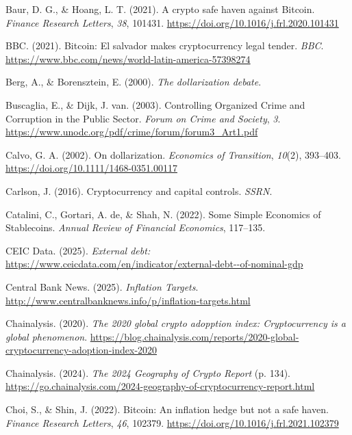 \documentclass[
]{article}
\newlength{\cslhangindent}
\newenvironment{CSLReferences}[2] %
 {\begin{list}{}{%
  \setlength{\itemindent}{0pt}
  \setlength{\leftmargin}{0pt}
  \setlength{\parsep}{0pt}
  \ifodd #1
   \setlength{\leftmargin}{\cslhangindent}
   \setlength{\itemindent}{-1\cslhangindent}
  \fi
  \setlength{\itemsep}{#2\baselineskip}}}
 {\end{list}}
\begin{document}
\begin{CSLReferences}{1}{0}
Baur, D. G., \& Hoang, L. T. (2021). A crypto safe haven against Bitcoin. \emph{Finance Research Letters}, \emph{38}, 101431. \url{https://doi.org/10.1016/j.frl.2020.101431}

BBC. (2021). Bitcoin: El salvador makes cryptocurrency legal tender. \emph{BBC}. \url{https://www.bbc.com/news/world-latin-america-57398274}

Berg, A., \& Borensztein, E. (2000). \emph{The dollarization debate}.

Buscaglia, E., \& Dijk, J. van. (2003). Controlling Organized Crime and Corruption in the Public Sector. \emph{Forum on Crime and Society}, \emph{3}. \url{https://www.unodc.org/pdf/crime/forum/forum3_Art1.pdf}

Calvo, G. A. (2002). On dollarization. \emph{Economics of Transition}, \emph{10}(2), 393--403. \url{https://doi.org/10.1111/1468-0351.00117}

Carlson, J. (2016). Cryptocurrency and capital controls. \emph{SSRN}.

Catalini, C., Gortari, A. de, \& Shah, N. (2022). Some Simple Economics of Stablecoins. \emph{Annual Review of Financial Economics}, 117--135.

CEIC Data. (2025). \emph{External debt:} \url{https://www.ceicdata.com/en/indicator/external-debt--of-nominal-gdp}

Central Bank News. (2025). \emph{Inflation Targets}. \url{http://www.centralbanknews.info/p/inflation-targets.html}

Chainalysis. (2020). \emph{The 2020 global crypto adopption index: Cryptocurrency is a global phenomenon}. \url{https://blog.chainalysis.com/reports/2020-global-cryptocurrency-adoption-index-2020}

Chainalysis. (2024). \emph{The 2024 Geography of Crypto Report} (p. 134). \url{https://go.chainalysis.com/2024-geography-of-cryptocurrency-report.html}

Choi, S., \& Shin, J. (2022). Bitcoin: An inflation hedge but not a safe haven. \emph{Finance Research Letters}, \emph{46}, 102379. \url{https://doi.org/10.1016/j.frl.2021.102379}


\end{CSLReferences}
\end{document}
